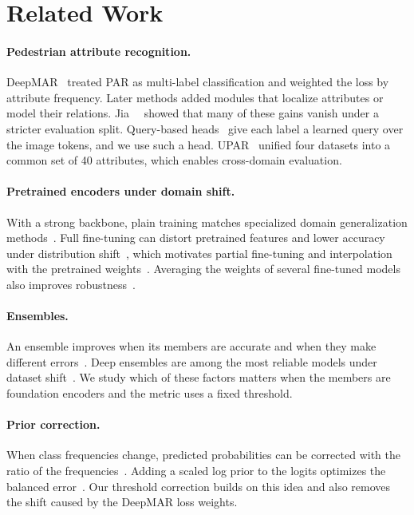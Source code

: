 \documentclass[10pt,twocolumn,letterpaper]{article}
\begin{document}
\section{Related Work}
\label{sec:related}

\paragraph{Pedestrian attribute recognition.} DeepMAR~\cite{deepmar} treated PAR as multi-label classification and weighted the loss by attribute frequency. Later methods added modules that localize attributes or model their relations. Jia~\etal~\cite{rethinkpar} showed that many of these gains vanish under a stricter evaluation split. Query-based heads~\cite{q2l,mldecoder} give each label a learned query over the image tokens, and we use such a head. UPAR~\cite{upar} unified four datasets into a common set of 40 attributes, which enables cross-domain evaluation.

\paragraph{Pretrained encoders under domain shift.} With a strong backbone, plain training matches specialized domain generalization methods~\cite{domainbed}. Full fine-tuning can distort pretrained features and lower accuracy under distribution shift~\cite{lpft}, which motivates partial fine-tuning and interpolation with the pretrained weights~\cite{wiseft}. Averaging the weights of several fine-tuned models also improves robustness~\cite{soups,diwa}.

\paragraph{Ensembles.} An ensemble improves when its members are accurate and when they make different errors~\cite{krogh}. Deep ensembles are among the most reliable models under dataset shift~\cite{deepens,ovadia}. We study which of these factors matters when the members are foundation encoders and the metric uses a fixed threshold.

\paragraph{Prior correction.} When class frequencies change, predicted probabilities can be corrected with the ratio of the frequencies~\cite{saerens,lipton}. Adding a scaled log prior to the logits optimizes the balanced error~\cite{logitadj}. Our threshold correction builds on this idea and also removes the shift caused by the DeepMAR loss weights.
\end{document}
